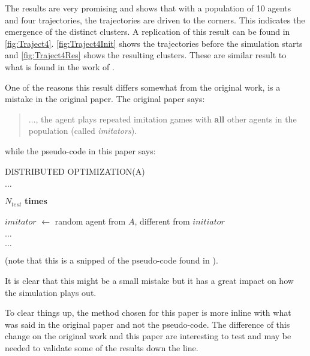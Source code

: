 The results are very promising and shows that with a population of 10 agents and four trajectories, the trajectories are driven to the corners.
This indicates the emergence of the distinct clusters.
A replication of this result can be found in \autoref{fig:Traject4}.
\autoref{fig:Traject4Init} shows the trajectories before the simulation starts and \autoref{fig:Traject4Res} shows the resulting clusters.
These are similar result to what is found in the work of \cite{de2010multi}.

One of the reasons this result differs somewhat from the original work, is a mistake in the original paper.
The original paper says:
\begin{quotation}
    $\dots$, the agent plays repeated imitation games with \textbf{all} other agents in the population (called \textit{imitators}). 
\end{quotation}
while the pseudo-code in this paper says:

\begin{algorithm}
    \caption{DISTRIBUTED OPTIMIZATION(A)}
    \begin{algorithmic}

        \State $\dots$
        \State 

        \Loop $N_{test}$ \textbf{times}

            \State $imitator$ $\leftarrow$ random agent from $A$, different from $initiator$

            \State $\dots$
        \EndLoop

        \State
        \State $\dots$
        
    \end{algorithmic}
\end{algorithm}

(note that this is a snipped of the pseudo-code found in \citep*{de2010multi}).

It is clear that this might be a small mistake but it has a great impact on how the simulation plays out.

To clear things up, the method chosen for this paper is more inline with what was said in the original paper and not the pseudo-code.
The difference of this change on the original work and this paper are interesting to test and may be needed to validate some of the results down the line.

